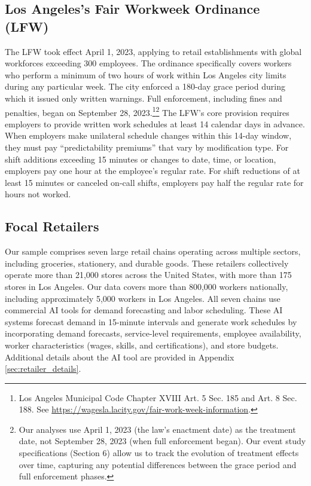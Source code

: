 \documentclass[letterpaper,11pt,leqno]{article}
\theoremstyle{paper}
\begin{document}
\subsection{Los Angeles's Fair Workweek Ordinance (LFW)} \label{subsec:losangeles_fw_intro}
The LFW took effect April 1, 2023, applying to retail establishments with global workforces exceeding 300 employees. The ordinance specifically covers workers who perform a minimum of two hours of work within Los Angeles city limits during any particular week. The city enforced a 180-day grace period during which it issued only written warnings. Full enforcement, including fines and penalties, began on September 28, 2023.\footnote{Los Angeles Municipal Code Chapter XVIII Art. 5 Sec. 185 and Art. 8 Sec. 188. See \url{https://wagesla.lacity.gov/fair-work-week-information}.}\footnote{Our analyses use April 1, 2023 (the law's enactment date) as the treatment date, not September 28, 2023 (when full enforcement began). Our event study specifications (Section 6) allow us to track the evolution of treatment effects over time, capturing any potential differences between the grace period and full enforcement phases.} The LFW's core provision requires employers to provide written work schedules at least 14 calendar days in advance. When employers make unilateral schedule changes within this 14-day window, they must pay ``predictability premiums'' that vary by modification type. For shift additions exceeding 15 minutes or changes to date, time, or location, employers pay one hour at the employee's regular rate. For shift reductions of at least 15 minutes or canceled on-call shifts, employers pay half the regular rate for hours not worked. 


\subsection{Focal Retailers} \label{subsec:focal_retailers}
Our sample comprises seven large retail chains operating across multiple sectors, including groceries, stationery, and durable goods. These retailers collectively operate more than 21,000 stores across the United States, with more than 175 stores in Los Angeles. Our data covers more than 800,000 workers nationally, including approximately 5,000 workers in Los Angeles. All seven chains use commercial AI tools for demand forecasting and labor scheduling. These AI systems forecast demand in 15-minute intervals and generate work schedules by incorporating demand forecasts, service-level requirements, employee availability, worker characteristics (wages, skills, and certifications), and store budgets. Additional details about the AI tool are provided in Appendix \ref{sec:retailer_details}. %
\end{document}
